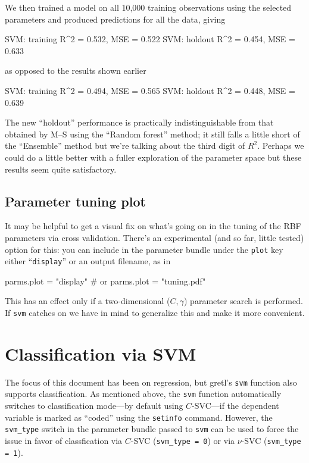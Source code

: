 \documentclass{article}
\begin{document}
We then trained a model on all 10,000 training observations using the
selected parameters and produced predictions for all the data, giving
\begin{code}
SVM: training R^2 = 0.532, MSE = 0.522
SVM: holdout  R^2 = 0.454, MSE = 0.633
\end{code}
as opposed to the results shown earlier
\begin{code}
SVM: training R^2 = 0.494, MSE = 0.565
SVM: holdout  R^2 = 0.448, MSE = 0.639
\end{code}
The new ``holdout'' performance is practically indistinguishable from
that obtained by M--S using the ``Random forest'' method; it still falls
a little short of the ``Ensemble'' method but we're talking about the
third digit of $R^2$. Perhaps we could do a little better with a
fuller exploration of the parameter space but these results seem
quite satisfactory.

\subsection{Parameter tuning plot}
\label{sec:plot}

It may be helpful to get a visual fix on what's going on in the tuning
of the RBF parameters via cross validation. There's an experimental
(and so far, little tested) option for this: you can include in the
parameter bundle under the \texttt{plot} key either
``\texttt{display}'' or an output filename, as in
\begin{code}
parms.plot = "display"
# or
parms.plot = "tuning.pdf"
\end{code}
This has an effect only if a two-dimensional ($C, \gamma$) parameter
search is performed. If \texttt{svm} catches on we have in mind to
generalize this and make it more convenient.

\section{Classification via SVM}
\label{sec:SVC}

The focus of this document has been on regression, but gretl's
\texttt{svm} function also supports classification. As mentioned
above, the \texttt{svm} function automatically switches to
classification mode---by default using $C$-SVC---if the dependent
variable is marked as ``coded'' using the \texttt{setinfo} command.
However, the \texttt{svm\_type} switch in the parameter bundle passed
to \texttt{svm} can be used to force the issue in favor of
classfication via $C$-SVC (\texttt{svm\_type = 0}) or via $\nu$-SVC
(\texttt{svm\_type = 1}).
\end{document}
